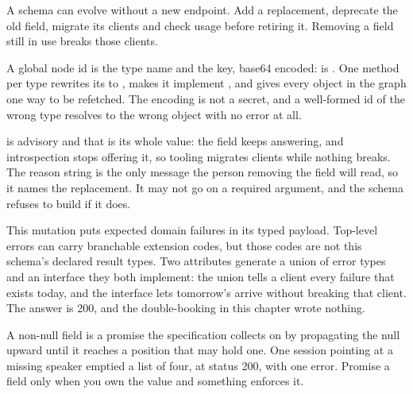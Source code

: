 \begin{chaptersummary}
  \item A schema can evolve without a new endpoint. Add a replacement,
        deprecate the old field, migrate its clients and check usage before
        retiring it. Removing a field still in use breaks those clients.
  \item A global node id is the type name and the key, base64 encoded:
         is . One \code{[NodeResolver]}
        method per type rewrites its  to , makes it
        implement , and gives every object in the graph one way to
        be refetched. The encoding is not a secret, and a well-formed id of
        the wrong type resolves to the wrong object with no error at all.
  \item {} is advisory and that is its whole value: the field
        keeps answering, and introspection stops offering it, so tooling
        migrates clients while nothing breaks. The reason string is the only
        message the person removing the field will read, so it names the
        replacement. It may not go on a required argument, and the schema
        refuses to build if it does.
  \item This mutation puts expected domain failures in its typed payload.
        Top-level errors can carry branchable extension codes, but those
        codes are not this schema's declared result types.
        Two \code{[Error<T>]} attributes generate a union of error types
        and an  interface they both implement: the union tells a
        client every failure that exists today, and the interface lets
        tomorrow's arrive without breaking that client. The answer is 200,
        and the double-booking in this chapter wrote nothing.
  \item A non-null field is a promise the specification collects on by
        propagating the null upward until it reaches a position that may hold
        one. One session pointing at a missing speaker emptied a list of four,
        at status 200, with one error. Promise a field only when you own the
        value and something enforces it.
\end{chaptersummary}
